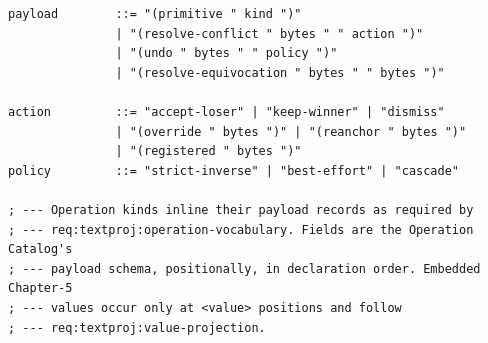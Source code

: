 \documentclass[11pt,letterpaper]{report}
\begin{document}
\begin{lstlisting}
payload        ::= "(primitive " kind ")"
               | "(resolve-conflict " bytes " " action ")"
               | "(undo " bytes " " policy ")"
               | "(resolve-equivocation " bytes " " bytes ")"

action         ::= "accept-loser" | "keep-winner" | "dismiss"
               | "(override " bytes ")" | "(reanchor " bytes ")"
               | "(registered " bytes ")"
policy         ::= "strict-inverse" | "best-effort" | "cascade"

; --- Operation kinds inline their payload records as required by
; --- req:textproj:operation-vocabulary. Fields are the Operation Catalog's
; --- payload schema, positionally, in declaration order. Embedded Chapter-5
; --- values occur only at <value> positions and follow
; --- req:textproj:value-projection.


\end{lstlisting}
\end{document}
